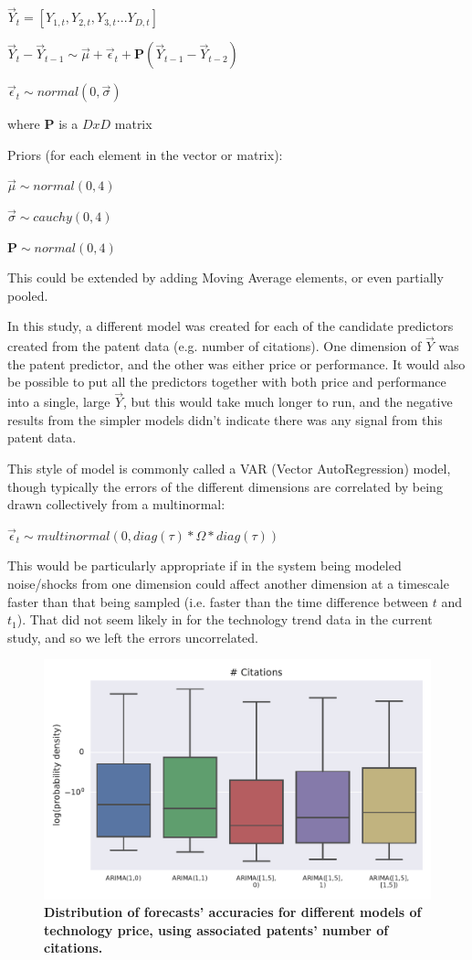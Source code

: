 \documentclass{article}
\begin{document}
$\vec{Y}_{t} = [Y_{1,t}, Y_{2,t}, Y_{3,t}...Y_{D,t}]$ 

$\vec{Y}_{t} - \vec{Y}_{t-1} \sim \vec{\mu} + \vec{\epsilon}_{t} + \mathbf{P}(\vec{Y}_{t-1}-\vec{Y}_{t-2})$

$\vec{\epsilon}_t \sim normal(0, \vec{\sigma})$

where $\mathbf{P}$ is a $D x D$ matrix


Priors (for each element in the vector or matrix):

$\vec{\mu} \sim normal(0,4)$

$\vec{\sigma} \sim cauchy(0,4)$

$\mathbf{P} \sim normal(0,4)$

This could be extended by adding Moving Average elements, or even partially pooled. 

In this study, a different model was created for each of the candidate predictors created from the patent data (e.g. number of citations). One dimension of $\vec{Y}$ was the patent predictor, and the other was either price or performance. It would also be possible to put all the predictors together with both price and performance into a single, large $\vec{Y}$, but this would take much longer to run, and the negative results from the simpler models didn't indicate there was any signal from this patent data. 

This style of model is commonly called a VAR (Vector AutoRegression) model, though typically the errors of the different dimensions are correlated by being drawn collectively from a multinormal:

$\vec{\epsilon}_t \sim multinormal(0,diag(\tau)*\Omega*diag(\tau))$

This would be particularly appropriate if in the system being modeled noise/shocks from one dimension could affect another dimension at a timescale faster than that being sampled (i.e. faster than the time difference between $t$ and $t_1$). That did not seem likely in for the technology trend data in the current study, and so we left the errors uncorrelated. 

\newpage
\begin{figure}
    \centering
    \includegraphics[width=.75\textwidth]{figs/VAR_Model_Prediction_Citations_Backward_N_Price.pdf}
    \caption{\textbf{Distribution of forecasts' accuracies for different models of technology price, using associated patents' number of citations.}}
    \label{VAR_Model_Prediction_Citations_Backward_N_Price}
\end{figure}
\end{document}
